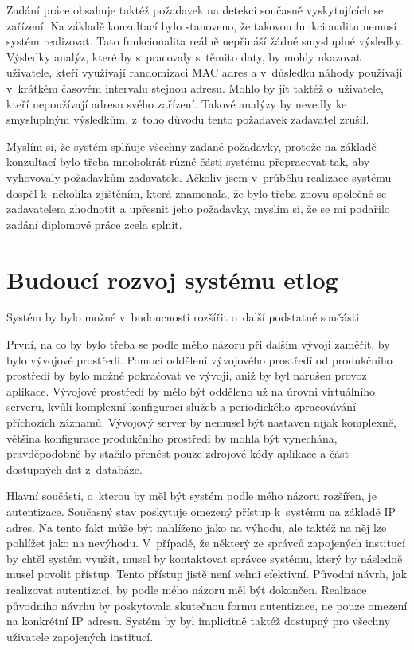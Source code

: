 \documentclass[thesis=M,czech]{FITthesis}[2012/06/26]
\begin{document}
\begin{conclusion}
  Zadání práce obsahuje taktéž požadavek na detekci současně vyskytujících se zařízení.
  Na základě konzultací bylo stanoveno, že takovou funkcionalitu nemusí systém realizovat.
  Tato funkcionalita reálně nepřináší žádné smysluplné výsledky.
  Výsledky analýz, které by s~pracovaly s~těmito daty, by 
  mohly ukazovat uživatele, 
  kteří využívají randomizaci MAC adres a v~důsledku náhody používají v~krátkém časovém intervalu stejnou adresu.
  Mohlo by jít taktéž o~uživatele, 
  kteří nepoužívají adresu svého zařízení.
  Takové analýzy by nevedly ke smysluplným výsledkům, z~toho důvodu tento požadavek zadavatel zrušil.

  Myslím si, že systém splňuje všechny zadané požadavky, 
  protože na základě konzultací bylo třeba mnohokrát různé části systému přepracovat tak, 
  aby vyhovovaly požadavkům zadavatele.
  Ačkoliv jsem v~průběhu realizace systému dospěl k~několika zjištěním, 
  která znamenala, že bylo třeba znovu společně se zadavatelem zhodnotit a upřesnit jeho požadavky,
  myslím si, že se mi podařilo zadání diplomové práce zcela splnit.

  \section{Budoucí rozvoj systému etlog}
    Systém by bylo možné v~budoucnosti rozšířit o~další podstatné součásti.
    
    První, na co by bylo třeba se podle mého názoru při dalším vývoji zaměřit,
    by bylo vývojové prostředí.
    Pomocí oddělení vývojového prostředí od produkčního prostředí by bylo možné
    pokračovat ve vývoji, aniž by byl narušen provoz aplikace.
    Vývojové prostředí by mělo být odděleno už na úrovni virtuálního serveru,
    kvůli komplexní konfiguraci služeb a periodického zpracovávání příchozích záznamů.
    Vývojový server by nemusel být nastaven nijak komplexně,
    většina konfigurace produkčního prostředí by mohla být vynechána,
    pravděpodobně by stačilo přenést pouze zdrojové kódy aplikace a část dostupných dat z~databáze.
    
    Hlavní součástí, o~kterou by měl být systém podle mého názoru rozšířen, je autentizace.
    Současný stav poskytuje omezený přístup k~systému na základě IP adres.
    Na tento fakt může být nahlíženo jako na výhodu, ale taktéž na něj
    lze pohlížet jako na nevýhodu.
    V~případě, že některý ze správců zapojených institucí by chtěl systém využít,
    musel by kontaktovat správce systému, který by následně musel povolit přístup.
    Tento přístup jistě není velmi efektivní.
    Původní návrh, jak realizovat autentizaci, by podle mého názoru měl být dokončen.
    Realizace původního návrhu by poskytovala skutečnou formu autentizace,
    ne pouze omezení na konkrétní IP adresu.
    Systém by byl implicitně taktéž dostupný pro všechny uživatele zapojených institucí.


\end{conclusion}
\end{document}
